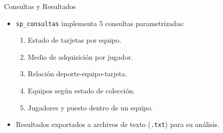 \documentclass{beamer}
\begin{document}
\begin{frame}{Consultas y Resultados}
  \begin{itemize}
    \item \texttt{sp\_consultas} implementa 5 consultas parametrizadas:
    \begin{enumerate}
      \item Estado de tarjetas por equipo.
      \item Medio de adquisición por jugador.
      \item Relación deporte-equipo-tarjeta.
      \item Equipos según estado de colección.
      \item Jugadores y puesto dentro de un equipo.
    \end{enumerate}
    \item Resultados exportados a archivos de texto (\texttt{.txt}) para su análisis.
  \end{itemize}
\end{frame}
\end{document}
